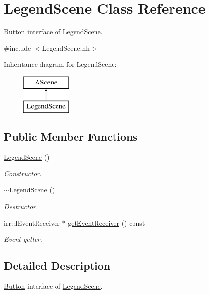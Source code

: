 \hypertarget{classLegendScene}{}\section{Legend\+Scene Class Reference}
\label{classLegendScene}


\hyperlink{classButton}{Button} interface of \hyperlink{classLegendScene}{Legend\+Scene}.  




{\ttfamily \#include $<$Legend\+Scene.\+hh$>$}

Inheritance diagram for Legend\+Scene\+:\begin{figure}[H]
\begin{center}
\leavevmode
\includegraphics[height=2.000000cm]{classLegendScene}
\end{center}
\end{figure}
\subsection*{Public Member Functions}
\begin{DoxyCompactItemize}
\item 
\hyperlink{classLegendScene_a33a4d96e0e320724e60d565dec448e38}{Legend\+Scene} ()
\begin{DoxyCompactList}\small\item\em Constructor. \end{DoxyCompactList}\item 
\hyperlink{classLegendScene_a88e66f9964236616735c7b9873641141}{$\sim$\+Legend\+Scene} ()
\begin{DoxyCompactList}\small\item\em Destructor. \end{DoxyCompactList}\item 
irr\+::\+I\+Event\+Receiver $\ast$ \hyperlink{classLegendScene_ab11340ae844c04d704f28e1ef188deae}{get\+Event\+Receiver} () const
\begin{DoxyCompactList}\small\item\em Event getter. \end{DoxyCompactList}\end{DoxyCompactItemize}


\subsection{Detailed Description}
\hyperlink{classButton}{Button} interface of \hyperlink{classLegendScene}{Legend\+Scene}. 

